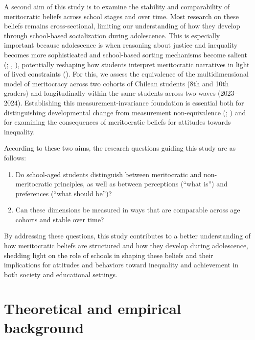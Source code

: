 \documentclass[
  13pt,
]{article}
\begin{document}
A second aim of this study is to examine the stability and comparability
of meritocratic beliefs across school stages and over time. Most
research on these beliefs remains cross-sectional, limiting our
understanding of how they develop through school-based socialization
during adolescence. This is especially important because adolescence is
when reasoning about justice and inequality becomes more sophisticated
and school-based sorting mechanisms become salient
(;
,
), potentially reshaping how
students interpret meritocratic narratives in light of lived constraints
(). For this, we
assess the equivalence of the multidimensional model of meritocracy
across two cohorts of Chilean students (8th and 10th graders) and
longitudinally within the same students across two waves (2023--2024).
Establishing this measurement-invariance foundation is essential both
for distinguishing developmental change from measurement non-equivalence
(;
)
and for examining the consequences of meritocratic beliefs for attitudes
towards inequality.

According to these two aims, the research questions guiding this study
are as follows:

\begin{enumerate}
\def\labelenumi{(\arabic{enumi})}
\item
  Do school-aged students distinguish between meritocratic and
  non-meritocratic principles, as well as between perceptions (``what
  is'') and preferences (``what should be'')?
\item
  Can these dimensions be measured in ways that are comparable across
  age cohorts and stable over time?
\end{enumerate}

By addressing these questions, this study contributes to a better
understanding of how meritocratic beliefs are structured and how they
develop during adolescence, shedding light on the role of schools in
shaping these beliefs and their implications for attitudes and behaviors
toward inequality and achievement in both society and educational
settings.

\section{Theoretical and empirical
background}\label{theoretical-and-empirical-background}
\end{document}
